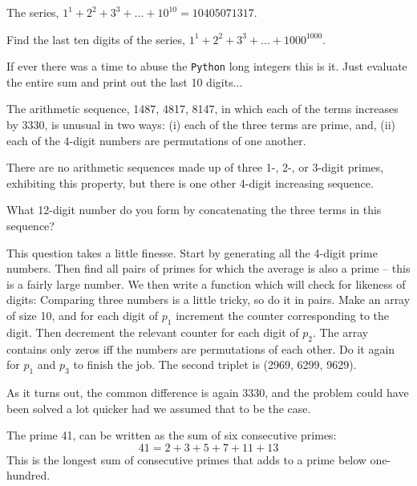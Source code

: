 


The series, $1^1 + 2^2 + 3^3 + ... + 10^{10} = 10405071317.$

Find the last ten digits of the series, $1^1 + 2^2 + 3^3 + ... + 1000^{1000}.$

If ever there was a time to abuse the \verb"Python" long integers this is it.  Just evaluate the entire sum
and print out the last 10 digits...




The arithmetic sequence, 1487, 4817, 8147, in which each of the terms increases by 3330, is unusual in two ways: (i) each of the three terms are prime, and, (ii) each of the 4-digit numbers are permutations of one another.

There are no arithmetic sequences made up of three 1-, 2-, or 3-digit primes, exhibiting this property, but there is one other 4-digit increasing sequence.

What 12-digit number do you form by concatenating the three terms in this sequence?

This question takes a little finesse.  Start by generating all the 4-digit prime numbers.  Then find all pairs
of primes for which the average is also a prime -- this is a fairly large number.  We then write a function which will
check for likeness of digits: Comparing three numbers is a little tricky, so do it in pairs.  Make an array of size 10,
and for each digit of $p_1$ increment the counter corresponding to the digit.  Then decrement the relevant counter
for each digit of $p_2$.  The array contains only zeros iff the numbers are permutations of each other.  Do it again for
$p_1$ and $p_3$ to finish the job.  The second triplet is (2969, 6299, 9629).

\footnotesize
As it turns out, the common difference is again 3330, and the problem could have been solved a lot quicker
had we assumed that to be the case.
\normalsize




The prime 41, can be written as the sum of six consecutive primes:
$$41 = 2 + 3 + 5 + 7 + 11 + 13$$
This is the longest sum of consecutive primes that adds to a prime below one-hundred.

